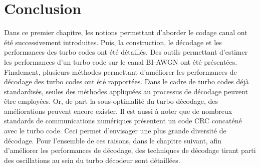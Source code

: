\section{Conclusion}
Dans ce premier chapitre, les notions permettant d'aborder le codage canal ont été successivement introduites. Puis, la 
construction, le décodage et les performances des turbo codes ont été détaillés. Des outils permettant d'estimer les 
performances d'un turbo code sur le canal BI-AWGN ont été présentées. Finalement, plusieurs méthodes permettant d'améliorer 
les performances de décodage des turbo codes ont été rapportées. Dans le cadre de turbo codes déjà standardisés, seules 
des méthodes appliquées au processus de décodage peuvent être employées. Or, de part la sous-optimalité du turbo décodage, des améliorations peuvent encore exister. Il est aussi à noter que de nombreux standards de communications numériques 
présentent un code CRC concaténé avec le turbo code. Ceci permet d'envisager une plus grande diversité de décodage. Pour 
l'ensemble de ces raisons, dans le chapitre suivant, afin d'améliorer les performances de décodage, des techniques de 
décodage tirant parti des oscillations au sein du turbo décodeur sont détaillées. 